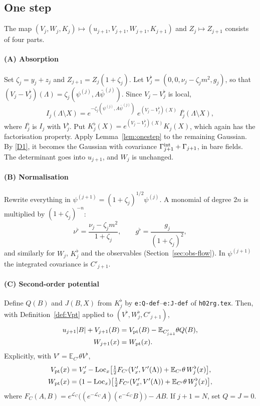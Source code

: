 \documentclass[11pt]{amsart}
\theoremstyle{definition}
\theoremstyle{remark}
\numberwithin{equation}{section}
\newcommand{\E}{\mathbb{E}}
\newcommand{\cL}{\mathcal{L}}
\newcommand{\Loc}{\operatorname{Loc}}
\newcommand{\hr}{\texttt{h02rg.tex}}
\begin{document}
\subsection{One step}
\label{sec:onestep}
The map $(V_j,W_j,K_j)\mapsto(u_{j+1},V_{j+1},W_{j+1},K_{j+1})$ and $Z_j\mapsto Z_{j+1}$
consists of four parts.

\paragraph{(A) Absorption}
Set $\zeta_j=y_j+z_j$ and $Z_{j+1}=Z_j(1+\zeta_j)$. Let $V_j^\flat=(0,0,\nu_j-\zeta_jm^2,g_j)$,
so that $(V_j-V_j^\flat)(\Lambda)=\zeta_j(\psi^{(j)},A\bar\psi^{(j)})$. Since $V_j-V_j^\flat$ is
local,
\[
  I_j(\Lambda\setminus X)=e^{-\zeta_j(\psi^{(j)},A\bar\psi^{(j)})}\;e^{(V_j-V^\flat_j)(X)}\;I^\flat_j(\Lambda\setminus X),
\]
where $I^\flat_j$ is $I_j$ with $V^\flat_j$. Put $K^\flat_j(X)=e^{(V_j-V_j^\flat)(X)}K_j(X)$,
which again has the factorisation property. Apply Lemma~\ref{lem:onestep} to the remaining Gaussian. By
\ref{D1}, it becomes the Gaussian with covariance $\Gamma^{\rm int}_{j+1}+\Gamma_{j+1}$, in bare
fields. The determinant goes into $u_{j+1}$, and $W_j$ is unchanged.

\paragraph{(B) Normalisation}
Rewrite everything in $\psi^{(j+1)}=(1+\zeta_j)^{1/2}\psi^{(j)}$. A monomial of degree $2n$ is
multiplied by $(1+\zeta_j)^{-n}$:
\[
  \nu^\flat=\frac{\nu_j-\zeta_jm^2}{1+\zeta_j},\qquad g^\flat=\frac{g_j}{(1+\zeta_j)^2},
\]
and similarly for $W_j$, $K^\flat_j$ and the observables (Section~\ref{sec:obs-flow}). In
$\psi^{(j+1)}$ the integrated covariance is $C'_{j+1}$.

\paragraph{(C) Second-order potential}
Define $Q(B)$ and $J(B,X)$ from $K^\flat_j$ by \texttt{e:Q-def}--\texttt{e:J-def} of \hr{}. Then,
with Definition~\ref{def:Vpt} applied to $(V^\flat,W^\flat_j,C'_{j+1})$,
\begin{align}
  u_{j+1}|B|+V_{j+1}(B)&=V_{\rm pt}(B)-\E_{C'_{j+1}}\theta Q(B),\label{e:V+}\\
  W_{j+1}(x)&=W_{\rm pt}(x).\label{e:W+}
\end{align}
Explicitly, with $V'=\E_{C'}\theta V^\flat$,
\begin{align*}
  V_{\rm pt}(x)&=V'_x-\Loc_x\bigl[\tfrac12F_{C'}(V'_x,V'(\Lambda))+\E_{C'}\theta\,W^\flat_j(x)\bigr],\\
  W_{\rm pt}(x)&=(1-\Loc_x)\bigl[\tfrac12F_{C'}(V'_x,V'(\Lambda))+\E_{C'}\theta\,W^\flat_j(x)\bigr],
\end{align*}
where $F_C(A,B)=e^{\cL_C}\bigl((e^{-\cL_C}A)(e^{-\cL_C}B)\bigr)-AB$. If $j+1=N$, set $Q=J=0$.
\end{document}
